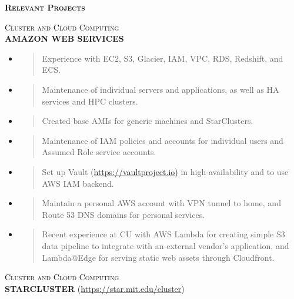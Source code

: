 \documentclass[]{article}
\begin{document}
\textbf{\textsc{Relevant Projects}}

\textsc{Cluster and Cloud Computing}\\
\textbf{AMAZON WEB SERVICES}

\begin{itemize}
\item
  \begin{quote}
  Experience with EC2, S3, Glacier, IAM, VPC, RDS, Redshift, and ECS.
  \end{quote}
\item
  \begin{quote}
  Maintenance of individual servers and applications, as well as HA
  services and HPC clusters.
  \end{quote}
\item
  \begin{quote}
  Created base AMIs for generic machines and StarClusters.
  \end{quote}
\item
  \begin{quote}
  Maintenance of IAM policies and accounts for individual users and
  Assumed Role service accounts.
  \end{quote}
\item
  \begin{quote}
  Set up Vault (\url{https://vaultproject.io)} in high-availability and
  to use AWS IAM backend.
  \end{quote}
\item
  \begin{quote}
  Maintain a personal AWS account with VPN tunnel to home, and Route 53
  DNS domains for personal services.
  \end{quote}
\item
  \begin{quote}
  Recent experience at CU with AWS Lambda for creating simple S3 data
  pipeline to integrate with an external vendor's application, and
  Lambda@Edge for serving static web assets through Cloudfront.
  \end{quote}
\end{itemize}

\textsc{Cluster and Cloud Computing}\\
\textbf{STARCLUSTER} (\url{https://star.mit.edu/cluster})
\end{document}
